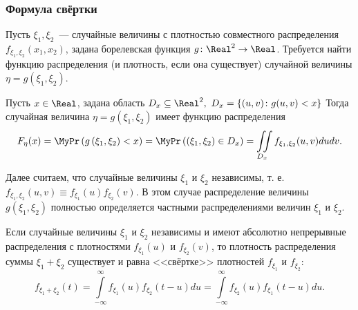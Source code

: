 \subsubsection{Формула свёртки}
Пусть $\xi_1, \xi_2$~--- случайные величины с плотностью совместного распределения $f_{\xi_{1}, \xi_{2}}\left(x_{1}, x_{2}\right)$, задана борелевская функция $g\colon \Real^{2} \to \Real$. 
Требуется найти функцию распределения (и плотность, если она существует) случайной величины $\eta=g\left(\xi_{1}, \xi_{2}\right)$.
\begin{lem}
    Пусть $x \in \Real$, задана область $D_{x} \subseteq \Real^{2},~ D_x = \{(u,v)\colon g(u,v) < x\}$ Тогда случайная величина $\eta=g\left(\xi_{1}, \xi_{2}\right)$ имеет функцию распределения
    \begin{equation*}
        F_{\eta}(x)=\MyPr\left(g\left(\xi_{1}, \xi_{2}\right)<x\right)=\MyPr\left(\left(\xi_{1}, \xi_{2}\right) \in D_{x}\right)=\iint\limits_{D_{x}} f_{\xi_{1}, \xi_{2}}(u, v) du dv.
    \end{equation*}
\end{lem}
Далее считаем, что случайные величины $\xi_1$ и $\xi_2$ независимы, т. е. $f_{\xi_{1}, \xi_{2}}(u, v) \equiv f_{\xi_{1}}(u) f_{\xi_{2}}(v)$. В этом случае распределение величины $g\left(\xi_{1}, \xi_{2}\right)$ полностью определяется частными распределениями величин $\xi_1$ и $\xi_2$.
\begin{namedthm}
    Если случайные величины $\xi_1$ и $\xi_2$ независимы и имеют абсолютно непрерывные распределения с плотностями $f_{\xi_{1}}(u)$ и $f_{\xi_{2}}(v)$, то плотность распределения суммы $\xi_{1}+\xi_{2}$ существует и равна <<свёртке>> плотностей $f_{\xi_{1}}$ и $f_{\xi_{2}}$:
    \begin{equation*}
        f_{\xi_{1}+\xi_{2}}(t)=\int\limits_{-\infty}^{\infty} f_{\xi_{1}}(u) f_{\xi_{2}}(t-u) du=\int\limits_{-\infty}^{\infty} f_{\xi_{2}}(u) f_{\xi_{1}}(t-u) du.
    \end{equation*}
\end{namedthm}

